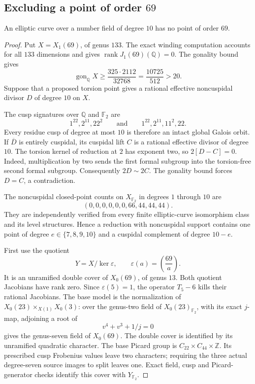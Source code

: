 \subsection{Excluding a point of order $69$}
\begin{proposition}\label{prop:decic-no69}
An elliptic curve over a number field of degree $10$ has no point of order $69$.
\end{proposition}
\begin{proof}
Put $X=X_1(69)$, of genus $133$. The exact winding computation
accounts for all $133$ dimensions and gives
$\operatorname{rank}J_1(69)(\mathbb Q)=0$.
The gonality bound gives
\[
 \operatorname{gon}_{\mathbb Q}X\geq
 \frac{325\cdot2112}{32768}=\frac{10725}{512}>20.
\]
Suppose that a proposed torsion point gives a rational effective
noncuspidal divisor $D$ of degree $10$ on $X$.

The cusp signatures over $\mathbb Q$ and $\mathbb F_2$ are
\[
 1^{22},2^{11},22^2\qquad\text{and}\qquad1^{22},2^{11},11^2,22.
\]
Every residue cusp of degree at most $10$ is therefore an intact
global Galois orbit. If $\overline D$ is entirely cuspidal, its
cuspidal lift $C$ is a rational effective divisor of degree $10$.
The torsion kernel of reduction at $2$ has exponent two, so
$2[D-C]=0$. Indeed, multiplication by two sends the first formal
subgroup into the torsion-free second formal subgroup.
Consequently $2D\sim2C$. The gonality bound forces $D=C$, a
contradiction.

The noncuspidal closed-point counts on $X_{\mathbb F_2}$ in
degrees $1$ through $10$ are
\[
 (0,0,0,0,0,0,66,44,44,44).
\]
They are independently verified from every finite elliptic-curve
isomorphism class and its level structures. Hence a reduction
with noncuspidal support contains one point of degree
$e\in\{7,8,9,10\}$ and a cuspidal complement of degree $10-e$.

First use the quotient
\[
 Y=X/\ker\varepsilon,\qquad
 \varepsilon(a)=\left(\frac{69}{a}\right).
\]
It is an unramified double cover of $X_0(69)$, of genus $13$.
Both quotient Jacobians have rank zero. Since
$\varepsilon(5)=1$, the operator $T_5-6$ kills their rational
Jacobians. The base model is the normalization of
$X_0(23)\times_{X(1)}X_0(3)$: over the genus-two field of
$X_0(23)_{\mathbb F_2}$, with its exact $j$-map, adjoining a root of
\[
 v^4+v^3+1/j=0
\]
gives the genus-seven field of $X_0(69)$.
The double cover is identified by its unramified quadratic
character. The base Picard group is
$C_{22}\times C_{44}\times\mathbb Z$.
Its prescribed cusp Frobenius values leave two characters;
requiring the three actual degree-seven source images to split
leaves one. Exact field, cusp and Picard-generator checks identify
this cover with $Y_{\mathbb F_2}$.


\end{proof}
